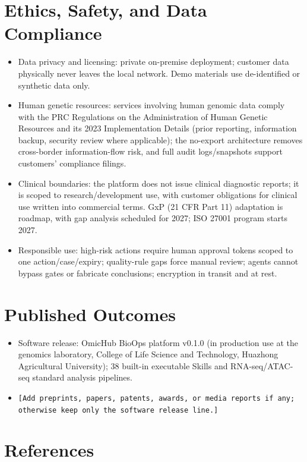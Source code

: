 \documentclass[11pt,a4paper]{article}
\begin{document}
\section{Ethics, Safety, and Data Compliance}

\begin{itemize}
  \item Data privacy and licensing: private on-premise deployment; customer data physically never leaves the local network. Demo materials use de-identified or synthetic data only.
  \item Human genetic resources: services involving human genomic data comply with the PRC Regulations on the Administration of Human Genetic Resources and its 2023 Implementation Details (prior reporting, information backup, security review where applicable); the no-export architecture removes cross-border information-flow risk, and full audit logs/snapshots support customers' compliance filings.
  \item Clinical boundaries: the platform does not issue clinical diagnostic reports; it is scoped to research/development use, with customer obligations for clinical use written into commercial terms. GxP (21 CFR Part 11) adaptation is roadmap, with gap analysis scheduled for 2027; ISO 27001 program starts 2027.
  \item Responsible use: high-risk actions require human approval tokens scoped to one action/case/expiry; quality-rule gaps force manual review; agents cannot bypass gates or fabricate conclusions; encryption in transit and at rest.
\end{itemize}

\section{Published Outcomes}

\begin{itemize}
  \item Software release: OmicHub BioOps platform v0.1.0 (in production use at the genomics laboratory, College of Life Science and Technology, Huazhong Agricultural University); 38 built-in executable Skills and RNA-seq/ATAC-seq standard analysis pipelines.
  \item \texttt{[Add preprints, papers, patents, awards, or media reports if any; otherwise keep only the software release line.]}
\end{itemize}

\section{References}
\end{document}
